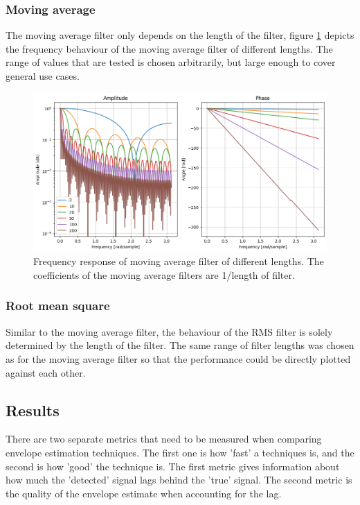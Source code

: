 \subsubsection{Moving average}
The moving average filter only depends on the length of the filter, figure \ref{fig:movingaverage_frequencyresponse_coefficients} depicts the frequency behaviour of the moving average filter of different lengths. The range of values that are tested is chosen arbitrarily, but large enough to cover general use cases.

\begin{figure}[h!t]
	\begin{center}
		\includegraphics[width=1.0\columnwidth]{images/movingaverage_frequencyresponse_coefficients.png}
	\end{center}
	\caption{Frequency response of moving average filter of different lengths. The coefficients of the moving average filters are 1/length of filter.}
	\label{fig:movingaverage_frequencyresponse_coefficients}
\end{figure}

\subsubsection{Root mean square}
Similar to the moving average filter, the behaviour of the RMS filter is solely determined by the length of the filter. The same range of filter lengths was chosen as for the moving average filter so that the performance could be directly plotted against each other.

\subsection{Results}
There are two separate metrics that need to be measured when comparing envelope estimation techniques. The first one is how 'fast' a techniques is, and the second is how 'good' the technique is. The first metric gives information about how much the 'detected' signal lags behind the 'true' signal. The second metric is the quality of the envelope estimate when accounting for the lag.

